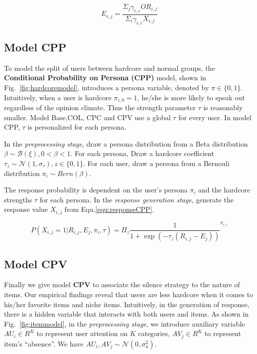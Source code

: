 \documentclass[sigconf]{acmart}
\begin{document}
\begin{equation}\label{equ:ecommunity}
 E_{c,j}=\frac{\Sigma_j\gamma_{i,c} OR_{i,j}}{\Sigma_i \gamma_{i,c} X_{i,j}}
\end{equation}

\subsection{Model CPP}
To model the split of users between hardcore and normal groups, the  \textbf{Conditional Probability on Persona (CPP)} model,  shown in Fig.~\ref{fig:hardcoremodel}, introduces a  persona variable,  denoted by $\pi \in \{0,1\}$. Intuitively, when a user is hardcore $\pi_{i,0}=1$, he/she is more likely to speak out regardless of the opinion climate. Thus the strength parameter $\tau$ is reasonably smaller.  Model Base,COL, CPC and CPV use a global $\tau$ for every user. In model CPP, $\tau$ is personalized for each persona.

In the \textit{preprocessing stage}, draw a persona distribution from a Beta distribution $\beta \sim \mathcal{B}(\xi), 0<\beta<1$. For each persona, Draw a hardcore coefficient $\tau_z \sim \mathcal{N}(1,\sigma_\tau), z\in \{0,1\}$. For each user, draw a persona from a Bernouli distribution $\pi_i \sim Bern (\beta)$. 

The response probability is dependent on the user's persona $\pi_i$ and the hardcore strengths $\tau$ for each persona. In the \textit{response generation stage}, generate the response value $X_{i,j}$ from Equ.\ref{equ:responseCPP}.

\begin{equation}\label{equ:responseCPP}
 P(X_{i,j}=1|R_{i,j},E_j,\pi_i,\tau)=\Pi_z {\frac{1}{1+\exp{(-\tau_z(R_{i,j}-E_j))}}}^{\pi_{i,z}}
\end{equation}

\subsection{Model CPV}
Finally we give model \textbf{CPV} to associate the silence strategy to the nature of items. Our empirical findings reveal that users are less hardcore when it comes to his/her favorite items and niche items. Intuitively, in the generation of response, there is a hidden variable that interacts with both users and items. As shown in Fig.~\ref{fig:itemmodel}, in the \textit{preprocessing stage}, we introduce auxiliary variable $AU_i\in R^K$ to represent user attention on $K$ categories, $AV_j\in R^K$ to represent item's ``absence''. We have  $AU_i, AV_j \sim \mathcal{N}(0,\sigma_a^2)$.
\end{document}
